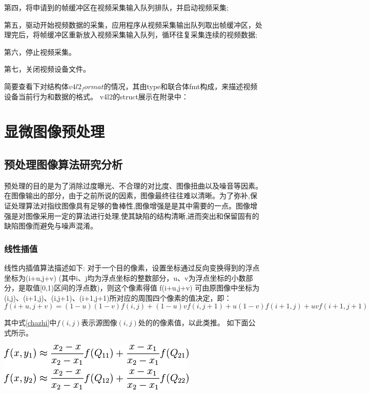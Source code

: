 第四，将申请到的帧缓冲区在视频采集输入队列排队，并启动视频采集;

第五，驱动开始视频数据的采集，应用程序从视频采集输出队列取出帧缓冲区，处理完后，将帧缓冲区重新放入视频采集输入队列，循环往复采集连续的视频数据;

第六，停止视频采集。

第七，关闭视频设备文件。

简要查看下对结构体$v4l2_format$的情况，其由type和联合体fmt构成，来描述视频设备当前行为和数据的格式。
v4l2的struct展示在附录中：

%



\section{显微图像预处理}
\subsection{预处理图像算法研究分析}
预处理的目的是为了消除过度曝光、不合理的对比度、图像扭曲以及噪音等因素。在图像输出的部分，由于之前所说的因素，图像最终往往难以清晰。为了弥补,保证处理算法对指纹图像具有足够的鲁棒性,图像增强是是其中需要的一点。图像增强是对图像采用一定的算法进行处理,使其缺陷的结构清晰,进而突出和保留固有的缺陷图像而避免与噪声混淆\cite{imageprocessing}。
\subsubsection{线性插值}
线性内插值算法描述如下:
对于一个目的像素，设置坐标通过反向变换得到的浮点坐标为(i+u,j+v) (其中i、j均为浮点坐标的整数部分，u、v为浮点坐标的小数部分，是取值[0,1)区间的浮点数)，则这个像素得值 f(i+u,j+v) 可由原图像中坐标为 (i,j)、(i+1,j)、(i,j+1)、(i+1,j+1)所对应的周围四个像素的值决定，即：
\begin{equation}
\label{chazhi}
f(i+u,j+v) = (1-u)(1-v)f(i,j) + (1-u)vf(i,j+1) + u(1-v)f(i+1,j) + uvf(i+1,j+1)  
\end{equation}


其中式\ref{chazhi}中$f(i,j)$表示源图像$(i,j)$处的的像素值，以此类推。
如下面公式所示。


\begin{center}
\includegraphics[width=0.7\linewidth]{Figure/figureline_1}
\end{center}


